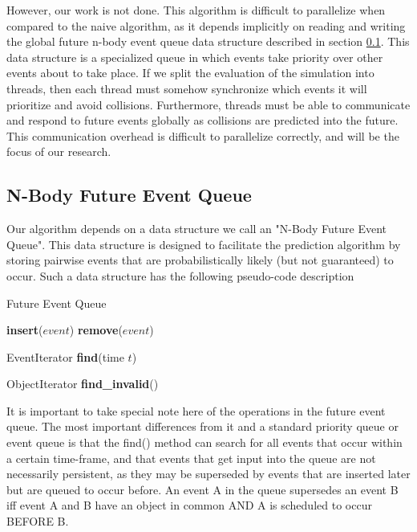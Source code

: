 \documentclass[CEJCS,PDF]{cej} %
\begin{document}
However, our work is not done.  This algorithm is difficult to parallelize when compared to the naive algorithm, as it depends implicitly on reading and writing the global future n-body event queue data structure described in section \ref{sec:neq}.  This data structure is a specialized queue in which events take priority over other events about to take place. If we split the evaluation of the simulation into threads, then each thread must somehow synchronize which events it will prioritize and avoid collisions.  Furthermore, threads must be able to communicate and respond to future events  globally as collisions are predicted into the future.  This communication overhead is difficult to parallelize correctly, and will be the focus of our research.

\subsection{N-Body Future Event Queue}
\label{sec:neq}
Our algorithm depends on a data structure we call an "N-Body Future Event Queue".  This data structure is designed to facilitate the prediction algorithm
by storing pairwise events that are probabilistically likely (but not guaranteed) to occur.  Such a data structure has the following pseudo-code description

\begin{algorithm}
\caption{Future Event Queue} %
\begin{algorithmic}
\STATE {}
\STATE \textbf{insert}($event$)
\STATE {}
\STATE \textbf{remove}($event$)
	
\STATE {}
\STATE EventIterator \textbf{find}(time $t$)

\STATE {}
\STATE ObjectIterator \textbf{find\_invalid}()
\end{algorithmic}
\end{algorithm}

It is important to take special note here of the operations in the future event queue.  The most important differences from it and a standard priority queue or event queue
is that the find() method can search for all events that occur within a certain time-frame, and that events that get input into the queue are not necessarily persistent, as they 
may be superseded by events that are inserted later but are queued to occur before.  An event A in the queue supersedes an event B iff event A and B have an object in common AND A is scheduled to occur BEFORE B.
\end{document}
